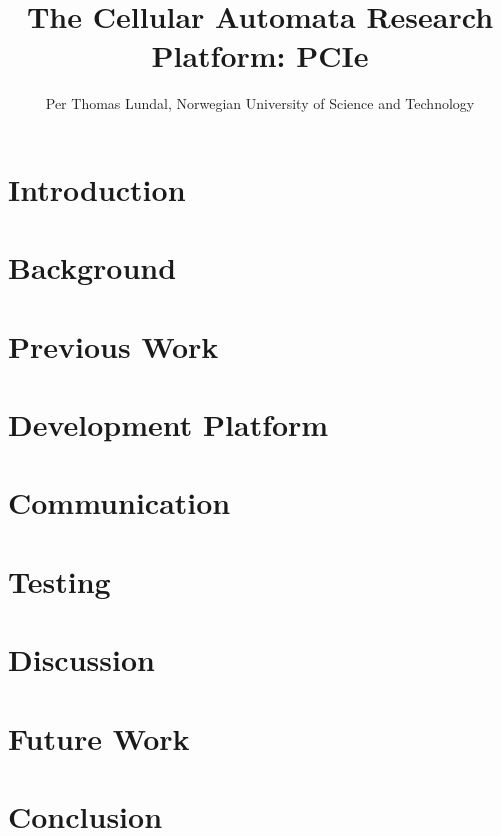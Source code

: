 \documentclass[a4paper]{IEEEtran}
\title{The Cellular Automata Research Platform: PCIe}
\author{Per Thomas Lundal, Norwegian University of Science and Technology}
\begin{document}
\maketitle

\begin{abstract}

    

\end{abstract}

\section{Introduction}

    

\section{Background}

    

\section{Previous Work}

    

\section{Development Platform}

    

\section{Communication}

    

\section{Testing}

    

\section{Discussion}

    

\section{Future Work}

    

\section{Conclusion}

    



\end{document}
